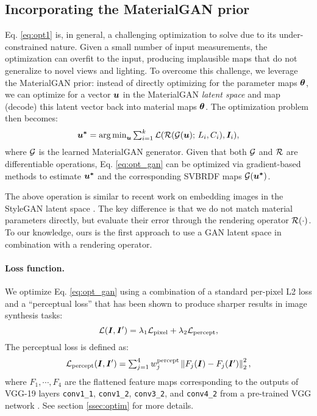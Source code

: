 \subsection{Incorporating the MaterialGAN prior}

Eq. \eqref{eq:opt1} is, in general, a challenging optimization to solve due to its under-constrained nature.
Given a small number of input measurements, the optimization can overfit to the input, producing implausible maps that do not generalize to novel views and lighting.
To overcome this challenge, we leverage the MaterialGAN prior: instead of directly optimizing for the parameter maps $\bm{\theta}$,  we can optimize for a vector $\bm{u}$ in the MaterialGAN \emph{latent space} and map (decode) this latent vector back into material maps $\bm{\theta}$.
The optimization problem then becomes:
\begin{equation}
	\label{eq:opt_gan}
	\bm{u^{*}} = \textstyle\operatorname*{arg\,min}_{\bm{u}} \sum_{i=1}^k \mathcal{L}(\mathcal{R}(\mathcal{G}(\bm{u}); \,L_i, C_i), \bm{I}_i),
\end{equation}
where $\mathcal{G}$ is the learned MaterialGAN generator.
Given that both $\mathcal{G}$ and $\mathcal{R}$ are differentiable operations, Eq. \eqref{eq:opt_gan} can be optimized via gradient-based methods to estimate $\bm{u^{*}}$ and the corresponding SVBRDF maps $\mathcal{G}(\bm{u^{*}})$.

The above operation is similar to recent work on embedding images in the StyleGAN latent space \cite{abdal2019image2stylegan,abdal2020image2stylegan++}.
The key difference is that we do not match material parameters directly, but evaluate their error through the rendering operator $\mathcal{R}(\cdot)$.
To our knowledge, ours is the first approach to use a GAN latent space in combination with a rendering operator.


\paragraph{Loss function.}
We optimize Eq. \ref{eq:opt_gan} using a combination of a standard per-pixel L2 loss and a ``perceptual loss'' \cite{johnson2016perceptual} that has been shown to produce sharper results in image synthesis tasks:
\begin{equation}
	\label{eq:loss}
	\mathcal{L}(\bm{I}, \bm{I}') = \lambda_1 \mathcal{L}_\mathrm{pixel} + \lambda_2 \mathcal{L}_\mathrm{percept},
\end{equation}
The perceptual loss is defined as:
\begin{equation}
	\mathcal{L}_\mathrm{percept}(\bm{I}, \bm{I}') = \textstyle\sum_{j=1}^4 w^\mathrm{percept}_j \left\|F_j(\bm{I}) - F_j(\bm{I}')\right\|_2^2,
\end{equation}
where $F_1, \cdots, F_4$ are the flattened feature maps corresponding to the outputs of VGG-19 layers  \texttt{conv1\_1}, \texttt{conv1\_2}, \texttt{conv3\_2}, and \texttt{conv4\_2} from a pre-trained VGG network \cite{simonyan2014very}. See section \ref{ssec:optim} for more details.



